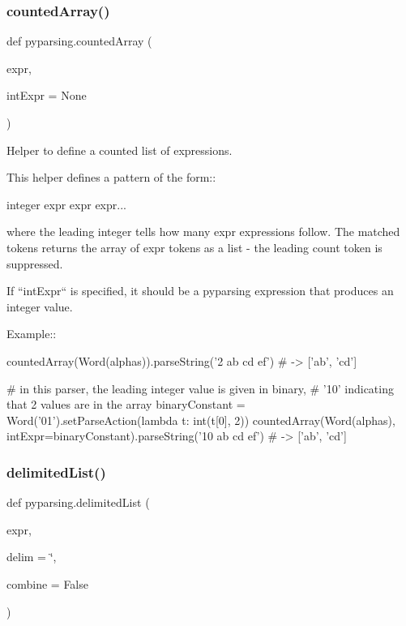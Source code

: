 \mbox{\label{namespacepyparsing_a9db2989e6618f26af797ca93bd7b5fdd}} 
\subsubsection{\texorpdfstring{counted\+Array()}{countedArray()}}
{\footnotesize\ttfamily def pyparsing.\+counted\+Array (\begin{DoxyParamCaption}\item[{}]{expr,  }\item[{}]{int\+Expr = {\ttfamily None} }\end{DoxyParamCaption})}

\begin{DoxyVerb}Helper to define a counted list of expressions.

This helper defines a pattern of the form::

    integer expr expr expr...

where the leading integer tells how many expr expressions follow.
The matched tokens returns the array of expr tokens as a list - the
leading count token is suppressed.

If ``intExpr`` is specified, it should be a pyparsing expression
that produces an integer value.

Example::

    countedArray(Word(alphas)).parseString('2 ab cd ef')  # -> ['ab', 'cd']

    # in this parser, the leading integer value is given in binary,
    # '10' indicating that 2 values are in the array
    binaryConstant = Word('01').setParseAction(lambda t: int(t[0], 2))
    countedArray(Word(alphas), intExpr=binaryConstant).parseString('10 ab cd ef')  # -> ['ab', 'cd']
\end{DoxyVerb}
 \mbox{\label{namespacepyparsing_a8f460285aae56fa589c97cc6d906321e}} 
\subsubsection{\texorpdfstring{delimited\+List()}{delimitedList()}}
{\footnotesize\ttfamily def pyparsing.\+delimited\+List (\begin{DoxyParamCaption}\item[{}]{expr,  }\item[{}]{delim = {\ttfamily \char`\"{}},  }\item[{}]{combine = {\ttfamily False} }\end{DoxyParamCaption})}


